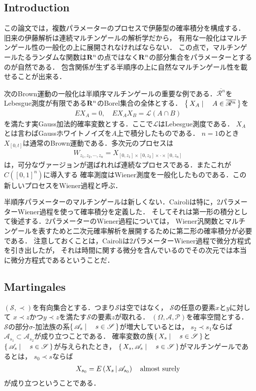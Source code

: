\subsection{Introduction}
	この論文では，複数パラメーターのプロセスで伊藤型の確率積分を構成する．
	旧来の伊藤解析は連続マルチンゲールの解析学だから，
	有用な一般化はマルチンゲール性の一般化の上に展開されなければならない．
	この点で，マルチンゲールたるランダムな関数は$\mathbf{R}^{n}$の点ではなく$\mathbf{R}^{n}$の部分集合をパラメーターとするのが自然である．
	包含関係が生ずる半順序の上に自然なマルチンゲール性を載せることが出来る．
	
	次のBrown運動の一般化は半順序マルチンゲールの重要な例である．$\overline{\mathscr{R}^{n}}$を
	Lebesgue測度が有限である$\mathbf{R}^{n}$のBorel集合の全体とする．
	$\left\{\, X_{A} \mid \quad A \in \overline{\mathscr{R}^{n}}\, \right\}$を
	\begin{align}
		EX_{A} = 0,\quad EX_{A}X_{B} = \mathscr{L}(A \cap B)
	\end{align}
	を満たす実Gauss加法的確率変数とする．ここで$\mathscr{L}$はLebesgue測度である．
	$X_{A}$とは言わばGaussホワイトノイズを$A$上で積分したものである．
	$n=1$のとき$X_{[0,t]}$は通常のBrown運動である．多次元のプロセスは
	\begin{align}
		W_{z_{1},z_{2},\cdots,z_{n}} = X_{[0,z_{1}] \times [0,z_{2}] \times \cdot \times [0,z_{n}]}
	\end{align}
	は，可分なヴァージョンが選ばれれば連続なプロセスである．またこれが$C([0,1]^{n})$に導入する
	確率測度はWiener測度を一般化したものである．この新しいプロセスをWiener過程と呼ぶ．
	
	半順序パラメーターのマルチンゲールは新しくない．Cairoliは特に，2パラメーターWiener過程を使って確率積分を定義した．
	そしてそれは第一形の積分として後述する．2パラメーターのWiener過程については，
	Wiener汎関数とマルチンゲールを表すためと二次元確率解析を展開するために第二形の確率積分が必要である．
	注意しておくことは，Cairoliは2パラメーターWiener過程で微分方程式を引き出したが，
	それは時間に関する微分を含んでいるのでその次元では本当に微分方程式であるということだ．
	
\subsection{Martingales}
	$(\mathscr{S},\prec)$を有向集合とする．つまり$\mathscr{S}$は空ではなく，
	$\mathscr{S}$の任意の要素$x$と$y$に対して
	$x \prec z$かつ$y \prec z$を満たす$\mathscr{S}$の要素$z$が取れる．
	$(\Omega,\mathscr{A},\mathscr{P})$を確率空間とする．
	$\mathscr{S}$の部分$\sigma$-加法族の系$\left\{\, \mathscr{A}_{s} \mid \quad s \in \mathscr{S}\, \right\}$が増大しているとは，
	$s_{2} \prec s_{1}$ならば$\mathscr{A}_{s_{1}} \subset \mathscr{A}_{s_{2}}$が成り立つことである．
	確率変数の族$\left\{\, X_{s} \mid \quad s \in \mathscr{S}\, \right\}$と$\left\{\, \mathscr{A}_{s} \mid \quad s \in \mathscr{S}\, \right\}$が与えられたとき，
	$\left\{\, X_{s},\mathscr{A}_{s} \mid \quad s \in \mathscr{S}\, \right\}$がマルチンゲールであるとは，
	$s_{0} \prec s$ならば
	\begin{align}
		X_{s_{0}} = E\left( X_{s} \, \middle|\, \mathscr{A}_{s_{0}} \right) \quad \mbox{almost surely}
	\end{align}
	が成り立つということである．
	
